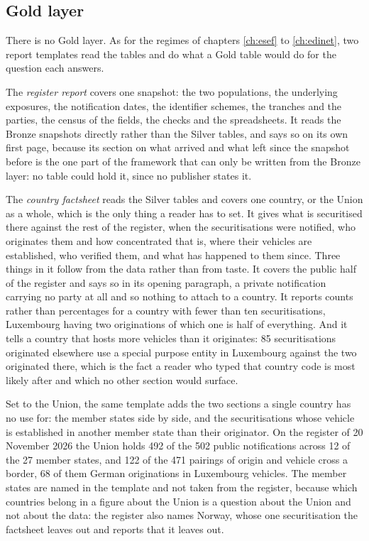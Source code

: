 \subsection{Gold layer}

There is no Gold layer. As for the regimes of chapters \ref{ch:esef} to \ref{ch:edinet}, two report templates read the tables and do what a Gold table would do for the question each answers.

The \emph{register report} covers one snapshot: the two populations, the underlying exposures, the notification dates, the identifier schemes, the tranches and the parties, the census of the fields, the checks and the spreadsheets. It reads the Bronze snapshots directly rather than the Silver tables, and says so on its own first page, because its section on what arrived and what left since the snapshot before is the one part of the framework that can only be written from the Bronze layer: no table could hold it, since no publisher states it.

The \emph{country factsheet} reads the Silver tables and covers one country, or the Union as a whole, which is the only thing a reader has to set. It gives what is securitised there against the rest of the register, when the securitisations were notified, who originates them and how concentrated that is, where their vehicles are established, who verified them, and what has happened to them since. Three things in it follow from the data rather than from taste. It covers the public half of the register and says so in its opening paragraph, a private notification carrying no party at all and so nothing to attach to a country. It reports counts rather than percentages for a country with fewer than ten securitisations, Luxembourg having two originations of which one is half of everything. And it tells a country that hosts more vehicles than it originates: 85 securitisations originated elsewhere use a special purpose entity in Luxembourg against the two originated there, which is the fact a reader who typed that country code is most likely after and which no other section would surface.

Set to the Union, the same template adds the two sections a single country has no use for: the member states side by side, and the securitisations whose vehicle is established in another member state than their originator. On the register of 20 November 2026 the Union holds 492 of the 502 public notifications across 12 of the 27 member states, and 122 of the 471 pairings of origin and vehicle cross a border, 68 of them German originations in Luxembourg vehicles. The member states are named in the template and not taken from the register, because which countries belong in a figure about the Union is a question about the Union and not about the data: the register also names Norway, whose one securitisation the factsheet leaves out and reports that it leaves out.

